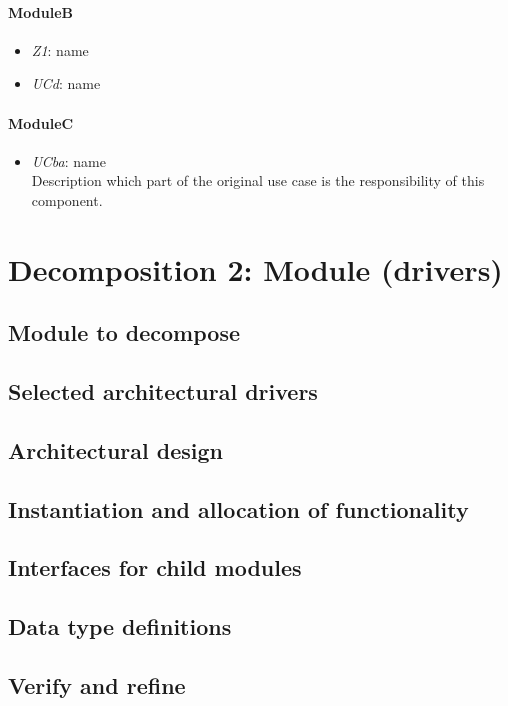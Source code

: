\documentclass[english]{sareport}
\begin{document}
\paragraph{ModuleB}
\begin{itemize}
	\item \emph{Z1}: name
	\item \emph{UCd}: name
\end{itemize}

\paragraph{ModuleC}
\begin{itemize}
	\item \emph{UCba}: name\\Description which part of the original use case is
	the responsibility of this component.
\end{itemize}

\section{Decomposition 2: Module (drivers)}
\subsection{Module to decompose}
\subsection{Selected architectural drivers}
\subsection{Architectural design}
\subsection{Instantiation and allocation of functionality}
\subsection{Interfaces for child modules}
\subsection{Data type definitions}
\subsection{Verify and refine}
\end{document}
